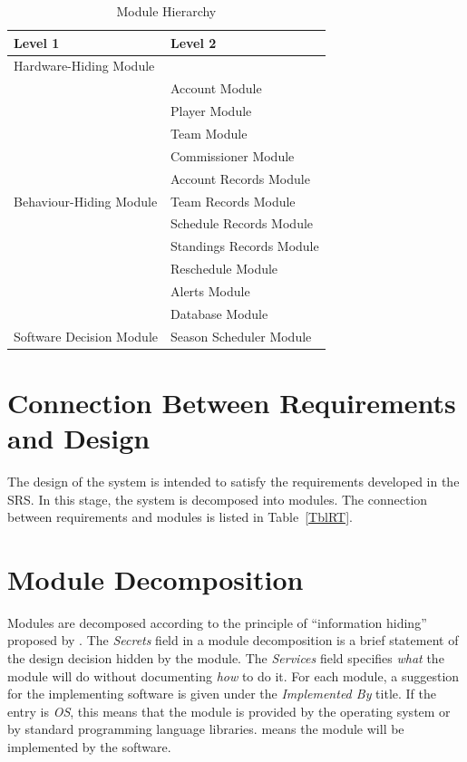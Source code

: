 \documentclass[12pt, titlepage]{article}
\begin{document}
\begin{table}[h!]
\centering
\begin{tabular}{p{} p{}}
\toprule
\textbf{Level 1} & \textbf{Level 2}\\
\midrule

{Hardware-Hiding Module} & ~ \\
\midrule

\multirow{11}{0.3\textwidth}{Behaviour-Hiding Module} & Account Module\\
& Player Module\\
& Team Module\\
& Commissioner Module\\
& Account Records Module\\
& Team Records Module\\
& Schedule Records Module\\
& Standings Records Module\\
& Reschedule Module\\
& Alerts Module\\
& Database Module\\
\midrule

{Software Decision Module} & Season Scheduler
Module\\
\midrule

\end{tabular}
\caption{Module Hierarchy}
\label{TblMH}
\end{table}

\section{Connection Between Requirements and Design} \label{SecConnection}

The design of the system is intended to satisfy the requirements developed in
the SRS. In this stage, the system is decomposed into modules. The connection
between requirements and modules is listed in Table~\ref{TblRT}.

\section{Module Decomposition} \label{SecMD}

Modules are decomposed according to the principle of ``information hiding''
proposed by \citet{ParnasEtAl1984}. The \emph{Secrets} field in a module
decomposition is a brief statement of the design decision hidden by the
module. The \emph{Services} field specifies \emph{what} the module will do
without documenting \emph{how} to do it. For each module, a suggestion for the
implementing software is given under the \emph{Implemented By} title. If the
entry is \emph{OS}, this means that the module is provided by the operating
system or by standard programming language libraries.  \emph{\progname{}}
means the module will be implemented by the \progname{} software.
\end{document}
